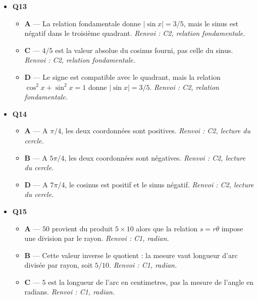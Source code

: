 \begin{itemize}
\begin{itemize}
    \item \textbf{D} — $-\sqrt3/2$ est le cosinus de $7\pi/6$, pas son sinus. \emph{Renvoi : C2, valeurs remarquables.}
  \end{itemize}
  \item \textbf{Q13}
  \begin{itemize}
    \item \textbf{A} — La relation fondamentale donne $|\sin x|=3/5$, mais le sinus est négatif dans le troisième quadrant. \emph{Renvoi : C2, relation fondamentale.}
    \item \textbf{C} — $4/5$ est la valeur absolue du cosinus fourni, pas celle du sinus. \emph{Renvoi : C2, relation fondamentale.}
    \item \textbf{D} — Le signe est compatible avec le quadrant, mais la relation $\cos^2x+\sin^2x=1$ donne $|\sin x|=3/5$. \emph{Renvoi : C2, relation fondamentale.}
  \end{itemize}
  \item \textbf{Q14}
  \begin{itemize}
    \item \textbf{A} — A $\pi/4$, les deux coordonnées sont positives. \emph{Renvoi : C2, lecture du cercle.}
    \item \textbf{B} — A $5\pi/4$, les deux coordonnées sont négatives. \emph{Renvoi : C2, lecture du cercle.}
    \item \textbf{D} — A $7\pi/4$, le cosinus est positif et le sinus négatif. \emph{Renvoi : C2, lecture du cercle.}
  \end{itemize}
  \item \textbf{Q15}
  \begin{itemize}
    \item \textbf{A} — $50$ provient du produit $5\times10$ alors que la relation $s=r\theta$ impose une division par le rayon. \emph{Renvoi : C1, radian.}
    \item \textbf{B} — Cette valeur inverse le quotient : la mesure vaut longueur d'arc divisée par rayon, soit $5/10$. \emph{Renvoi : C1, radian.}
    \item \textbf{C} — $5$ est la longueur de l'arc en centimetres, pas la mesure de l'angle en radians. \emph{Renvoi : C1, radian.}
  \end{itemize}
\end{itemize}
\fi
